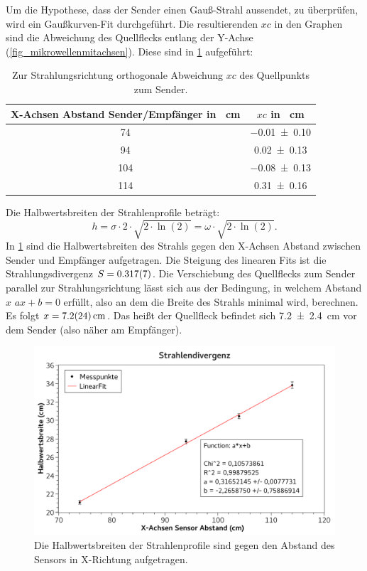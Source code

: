 \documentclass[
	a4paper,
	12pt,
	pagesize,
	ngerman
]{scrartcl}
\begin{document}
	Um die Hypothese, dass der Sender einen Gauß-Strahl aussendet, zu überprüfen, wird ein Gaußkurven-Fit durchgeführt. 
	Die resultierenden $xc$ in den Graphen sind die Abweichung des Quellflecks entlang der Y-Achse (\cref{fig_mikrowellenmitachsen}). 
	Diese sind in \cref{tab_xc} aufgeführt:
	\begin{table}[H]
		\centering
		\begin{tabular}{ c | c }
			X-Achsen Abstand Sender/Empfänger in \SI{}{cm} & $xc$ in \SI{}{cm}  \\ \hline
			\SI{74}{}&\SI{-0,01+-0,10}{}\\
			\SI{94}{}&\SI{0,02+-0,13}{}\\
			\SI{104}{}&\SI{-0,08+-0,13}{}\\
			\SI{114}{}&\SI{0,31+-0,16}{}\\
		\end{tabular}
		\caption{Zur Strahlungsrichtung orthogonale Abweichung $xc$ des Quellpunkts zum Sender.}
		\label{tab_xc} 
	\end{table}

	Die Halbwertsbreiten der Strahlenprofile beträgt: 
	\begin{equation}
		h = \sigma \cdot 2 \cdot \sqrt{2\cdot\ln(2)} = \omega \cdot \sqrt{2\cdot\ln(2)}.
	\end{equation}
	In \cref{fig_divergenz} sind die Halbwertsbreiten des Strahls gegen den X-Achsen Abstand zwischen Sender und Empfänger aufgetragen.
	Die Steigung des linearen Fits ist die Strahlungsdivergenz $S = \SI{0,317+-0,007}{}$.
	Die Verschiebung des Quellflecks zum Sender parallel zur Strahlungsrichtung lässt sich aus der Bedingung, in welchem Abstand $x$ $ax+b=0$ erfüllt, also an dem die Breite des Strahls minimal wird, berechnen. %
	Es folgt $x=\SI{7,2+-2,4}{cm}$.
	Das heißt der Quellfleck befindet sich \SI{7,2+-2,4}{cm} vor dem Sender (also näher am Empfänger).

	\begin{figure}[H]
		\includegraphics[width=1\textwidth]{fig_divergenz}
		\centering
		\caption{Die Halbwertsbreiten der Strahlenprofile sind gegen den Abstand des Sensors in X-Richtung aufgetragen.}
		\label{fig_divergenz}
		\centering
	\end{figure}
	
\end{document}
